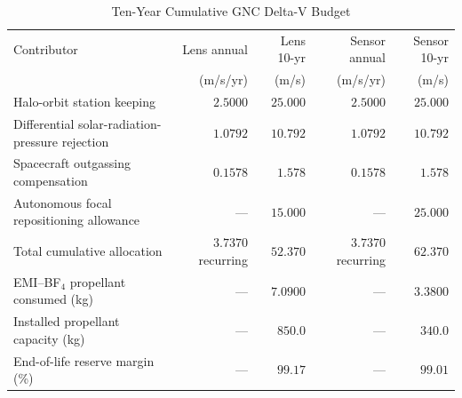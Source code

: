 \documentclass[10pt,twocolumn]{IEEEtran}
\begin{document}
\begin{table}[t]
\caption{Ten-Year Cumulative GNC Delta-V Budget}
\label{tab:ten_year_delta_v}
\centering
\footnotesize
\begin{tabular}{@{}p{4.55cm}rrrr@{}}
\toprule
Contributor & Lens annual & Lens 10-yr & Sensor annual & Sensor 10-yr \\
& (m/s/yr) & (m/s) & (m/s/yr) & (m/s) \\
\midrule
Halo-orbit station keeping & $2.5000$ & $25.000$ & $2.5000$ & $25.000$ \\
Differential solar-radiation-pressure rejection & $1.0792$ & $10.792$ & $1.0792$ & $10.792$ \\
Spacecraft outgassing compensation & $0.1578$ & $1.578$ & $0.1578$ & $1.578$ \\
Autonomous focal repositioning allowance & --- & $15.000$ & --- & $25.000$ \\
\midrule
Total cumulative allocation & $3.7370$ recurring & $52.370$ & $3.7370$ recurring & $62.370$ \\
\midrule
EMI--BF$_4$ propellant consumed (kg) & --- & $7.0900$ & --- & $3.3800$ \\
Installed propellant capacity (kg) & --- & $850.0$ & --- & $340.0$ \\
End-of-life reserve margin (\%) & --- & $99.17$ & --- & $99.01$ \\
\bottomrule
\end{tabular}
\end{table}
\end{document}
